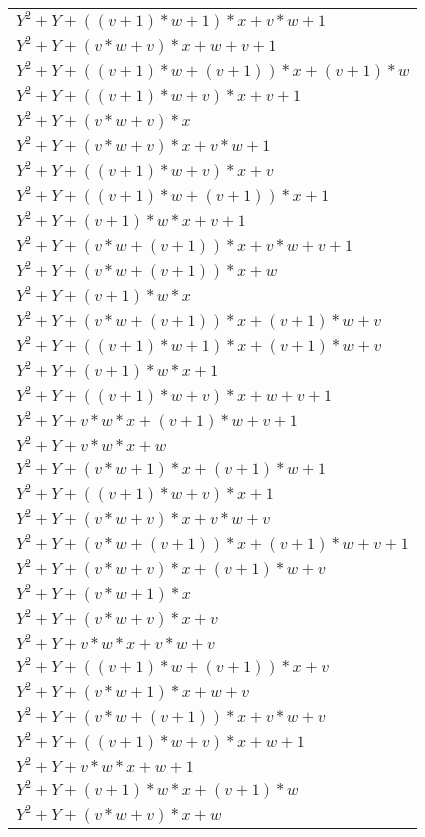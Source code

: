 \documentclass[12pt]{article}
\begin{document}
\begin{adjustwidth}{-2cm}{}
\begin{center}
\begin{longtable}{|l|}
	$Y^2 + Y + ((v + 1)*w + 1)*x + v*w + 1$ \\
	$Y^2 + Y + (v*w + v)*x + w + v + 1$ \\
	$Y^2 + Y + ((v + 1)*w + (v + 1))*x + (v + 1)*w$ \\
	$Y^2 + Y + ((v + 1)*w + v)*x + v + 1$ \\
	$Y^2 + Y + (v*w + v)*x$ \\
	$Y^2 + Y + (v*w + v)*x + v*w + 1$ \\
	$Y^2 + Y + ((v + 1)*w + v)*x + v$ \\
	$Y^2 + Y + ((v + 1)*w + (v + 1))*x + 1$ \\
	$Y^2 + Y + (v + 1)*w*x + v + 1$ \\
	$Y^2 + Y + (v*w + (v + 1))*x + v*w + v + 1$ \\
	$Y^2 + Y + (v*w + (v + 1))*x + w$ \\
	$Y^2 + Y + (v + 1)*w*x$ \\
	$Y^2 + Y + (v*w + (v + 1))*x + (v + 1)*w + v$ \\
	$Y^2 + Y + ((v + 1)*w + 1)*x + (v + 1)*w + v$ \\
	$Y^2 + Y + (v + 1)*w*x + 1$ \\
	$Y^2 + Y + ((v + 1)*w + v)*x + w + v + 1$ \\
	$Y^2 + Y + v*w*x + (v + 1)*w + v + 1$ \\
	$Y^2 + Y + v*w*x + w$ \\
	$Y^2 + Y + (v*w + 1)*x + (v + 1)*w + 1$ \\
	$Y^2 + Y + ((v + 1)*w + v)*x + 1$ \\
	$Y^2 + Y + (v*w + v)*x + v*w + v$ \\
	$Y^2 + Y + (v*w + (v + 1))*x + (v + 1)*w + v + 1$ \\
	$Y^2 + Y + (v*w + v)*x + (v + 1)*w + v$ \\
	$Y^2 + Y + (v*w + 1)*x$ \\
	$Y^2 + Y + (v*w + v)*x + v$ \\
	$Y^2 + Y + v*w*x + v*w + v$ \\
	$Y^2 + Y + ((v + 1)*w + (v + 1))*x + v$ \\
	$Y^2 + Y + (v*w + 1)*x + w + v$ \\
	$Y^2 + Y + (v*w + (v + 1))*x + v*w + v$ \\
	$Y^2 + Y + ((v + 1)*w + v)*x + w + 1$ \\
	$Y^2 + Y + v*w*x + w + 1$ \\
	$Y^2 + Y + (v + 1)*w*x + (v + 1)*w$ \\
	$Y^2 + Y + (v*w + v)*x + w$ \\

\end{longtable}
\end{center}
\end{adjustwidth}
\end{document}
